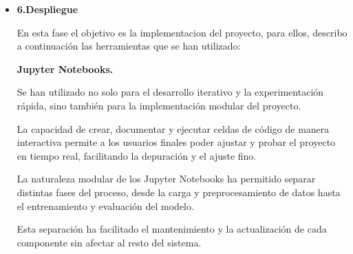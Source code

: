 \begin{itemize}
\item
\textbf{6.Despliegue}

En esta fase el objetivo es la implementacion del proyecto, para ellos, describo a continuación las herramientas que se han utilizado:


\textbf{Jupyter Notebooks.} 

Se han utilizado no solo para el desarrollo iterativo y la experimentación rápida, sino también para la implementación modular del proyecto. 

La capacidad de crear, documentar y ejecutar celdas de código de manera interactiva permite a los usuarios finales poder ajustar y probar el proyecto en tiempo real, facilitando la depuración y el ajuste fino.

La naturaleza modular de los Jupyter Notebooks ha permitido separar distintas fases del proceso, desde la carga y preprocesamiento de datos hasta el entrenamiento y evaluación del modelo. 

Esta separación ha facilitado el mantenimiento y la actualización de cada componente sin afectar al resto del sistema.
\end{itemize}